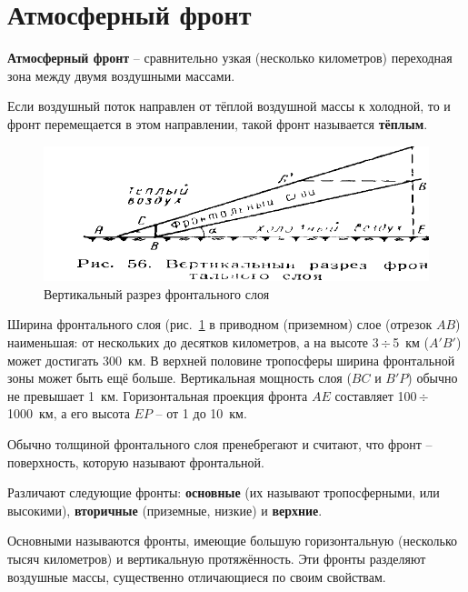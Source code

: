 \documentclass[a4paper, 12pt, twoside, final, book, russian, fittopage, cyremdash, openright]{ncc}
\newcommand{\otdo}{\,\ensuremath{\div}\,}
\begin{document}
\section{Атмосферный фронт}
\label{sec:front}

\textbf{Атмосферный фронт} \--- сравнительно
узкая (несколько километров) переходная зона между двумя воздушными
массами.

Если воздушный поток направлен от тёплой воздушной массы к холодной,
то и фронт перемещается в этом направлении, такой фронт называется
\textbf{тёплым}.

\begin{figure}[htb]
   \centering
   \includegraphics[scale=1.0]{05_vertical_front.pdf}
   \caption{Вертикальный разрез фронтального слоя}
   \label{fig:05_vertical_front}
\end{figure}

Ширина фронтального слоя (рис.~\ref{fig:05_vertical_front} в приводном
(приземном) слое (отрезок $AB$) наименьшая: от нескольких до десятков
километров, а на высоте 3\otdo{}5~км ($A'B'$) может достигать
300~км. В верхней половине тропосферы ширина фронтальной зоны может
быть ещё больше. Вертикальная мощность слоя ($BC$ и $B'P$) обычно не
превышает 1~км. Горизонтальная проекция фронта $AE$ составляет
100\otdo{}1000~км, а его высота $EP$ \--- от 1 до 10~км.

Обычно толщиной фронтального слоя пренебрегают и считают, что фронт
\--- поверхность, которую называют фронтальной.

Различают следующие фронты: \textbf{основные}
(их называют тропосферными, или
высокими), \textbf{вторичные}
(приземные, низкие) и
\textbf{верхние}.

Основными называются фронты, имеющие большую горизонтальную
(несколько тысяч километров) и вертикальную протяжённость. Эти фронты
разделяют воздушные массы, существенно отличающиеся по своим
свойствам.
\end{document}
